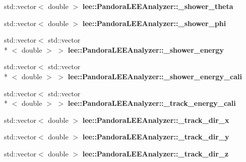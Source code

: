 \begin{DoxyCompactItemize}
\item 
\hypertarget{group__lee_ga3ad8af27c4c242410ffe4c1e1407e3c0}{std\-::vector$<$ double $>$ {\bfseries lee\-::\-Pandora\-L\-E\-E\-Analyzer\-::\-\_\-shower\-\_\-theta}}\label{group__lee_ga3ad8af27c4c242410ffe4c1e1407e3c0}

\item 
\hypertarget{group__lee_ga97c2d25dc1e253d867353b1c4562967c}{std\-::vector$<$ double $>$ {\bfseries lee\-::\-Pandora\-L\-E\-E\-Analyzer\-::\-\_\-shower\-\_\-phi}}\label{group__lee_ga97c2d25dc1e253d867353b1c4562967c}

\item 
\hypertarget{group__lee_gaf1fab9490fef935944f24feb7450f76c}{std\-::vector$<$ std\-::vector\\*
$<$ double $>$ $>$ {\bfseries lee\-::\-Pandora\-L\-E\-E\-Analyzer\-::\-\_\-shower\-\_\-energy}}\label{group__lee_gaf1fab9490fef935944f24feb7450f76c}

\item 
\hypertarget{group__lee_gac5a201dfcee71af90a4076c07a959ebf}{std\-::vector$<$ std\-::vector\\*
$<$ double $>$ $>$ {\bfseries lee\-::\-Pandora\-L\-E\-E\-Analyzer\-::\-\_\-shower\-\_\-energy\-\_\-cali}}\label{group__lee_gac5a201dfcee71af90a4076c07a959ebf}

\item 
\hypertarget{group__lee_gabc42592a0839c13f76a4eb677328cfb3}{std\-::vector$<$ std\-::vector\\*
$<$ double $>$ $>$ {\bfseries lee\-::\-Pandora\-L\-E\-E\-Analyzer\-::\-\_\-track\-\_\-energy\-\_\-cali}}\label{group__lee_gabc42592a0839c13f76a4eb677328cfb3}

\item 
\hypertarget{group__lee_ga8a992d49401db441d8c6e890ce1c1bce}{std\-::vector$<$ double $>$ {\bfseries lee\-::\-Pandora\-L\-E\-E\-Analyzer\-::\-\_\-track\-\_\-dir\-\_\-x}}\label{group__lee_ga8a992d49401db441d8c6e890ce1c1bce}

\item 
\hypertarget{group__lee_ga28bd177e5a7cacbd35fb5aec0865cd57}{std\-::vector$<$ double $>$ {\bfseries lee\-::\-Pandora\-L\-E\-E\-Analyzer\-::\-\_\-track\-\_\-dir\-\_\-y}}\label{group__lee_ga28bd177e5a7cacbd35fb5aec0865cd57}

\item 
\hypertarget{group__lee_ga2349ca54f697314697ff75504bbf042e}{std\-::vector$<$ double $>$ {\bfseries lee\-::\-Pandora\-L\-E\-E\-Analyzer\-::\-\_\-track\-\_\-dir\-\_\-z}}\label{group__lee_ga2349ca54f697314697ff75504bbf042e}


\end{DoxyCompactItemize}
